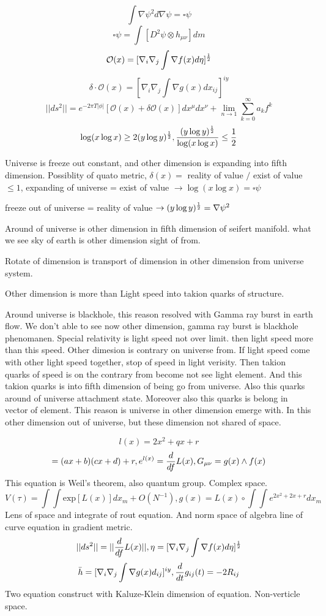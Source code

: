 \documentclass{jsarticle}
\begin{document}
$$ \int{\nabla \psi^2 d \nabla \psi} = \square \psi $$ 
$$\square \psi = \int [D^2 \psi \otimes h_{\mu\nu}]dm $$
$$ \mathcal{O}(x) = [\nabla_{i}\nabla_{j} \int \nabla f(x) d \eta]^{1 \over 2} $$
$$ \delta \cdot \mathcal{O}(x) = [\nabla_{i}\nabla_{j}\int \nabla g(x) dx_{ij}]^{iy} $$
$$ ||ds^2|| = e^{-2 \pi T|\phi|}[\mathcal{O}(x) + \delta \mathcal{O}(x)]dx^{\mu}dx^{\nu} + \lim_{n \to 1}
\sum_{k=0}^{\infty}a_k f^k $$
$$ \log (x \log x) \ge 2(y \log y)^{1 \over 2}, {{(y \log y)^{1 \over 2} \over \log (x \log x)}} \le {1 \over 2} $$

  Universe is freeze out constant, and other dimension is expanding into fifth dimension. 
  Possiblity of quato metric, 
  $ \delta (x) = $ reality of value $ / $ exist of value $ \le 1 $,
  expanding of universe = exist of value $ \to \log (x \log x) = \square \psi $

  freeze out of universe = reality of value $ \to (y \log y)^{1 \over 2} = \nabla \psi^2 $


  Around of universe is other dimension in fifth dimension of seifert manifold.
  what we see sky of earth is other dimension sight of from.

  Rotate of dimension is transport of dimension in other dimension from universe system.

  Other dimension is more than Light speed into takion quarks of structure. 

  Around universe is blackhole, this reason resolved with Gamma ray burst in earth flow.
  We don't able to see now other dimension, gamma ray burst is blackhole phenomanen.
  Special relativity is light speed not over limit. then light speed more than this speed.
  Other dimesion is contrary on universe from.
  If light speed come with other light speed together, stop of speed in light verisity.
  Then takion quarks of speed is on the contrary from become not see light element.
  And this takion quarks is into fifth dimension of being go from universe.
  Also this quarks around of universe attachment state.
  Moreover also this quarks is belong in vector of element.
  This reason is universe in other dimension emerge with.
  In this other dimension out of universe, but these dimension not shared of space.


  $$ l(x) = 2 x^2 + qx + r  $$
  $$ = (ax + b)(cx + d) + r, e^{l(x)} = {d \over df}L(x), G_{\mu\nu} = g(x) \wedge f(x) $$
  This equation is Weil's theorem, also quantum group. Complex space.
  $$ V(\tau) = \int \int \mathrm{exp}[L(x)]dx_m + O(N^{-1}), g(x) = L(x) \circ \int \int e^{2x^2 + 2x + r}dx_m $$
  Lens of space and integrate of rout equation. And norm space of algebra line of curve equation in gradient metric.
  $$ ||ds^2|| = ||{d \over df}L(x)||, \eta = [\nabla_{i}\nabla_{j}\int \nabla f(x) d \eta]^{1 \over 2} $$
  $$ \bar{h} = [\nabla_{i}\nabla_{j}\int \nabla g(x) d_{ij}]^{iy}, {d \over dt}g_{ij}(t) = - 2R_{ij} $$
  Two equation construct with Kaluze-Klein dimension of equation. Non-verticle space.
\end{document}
